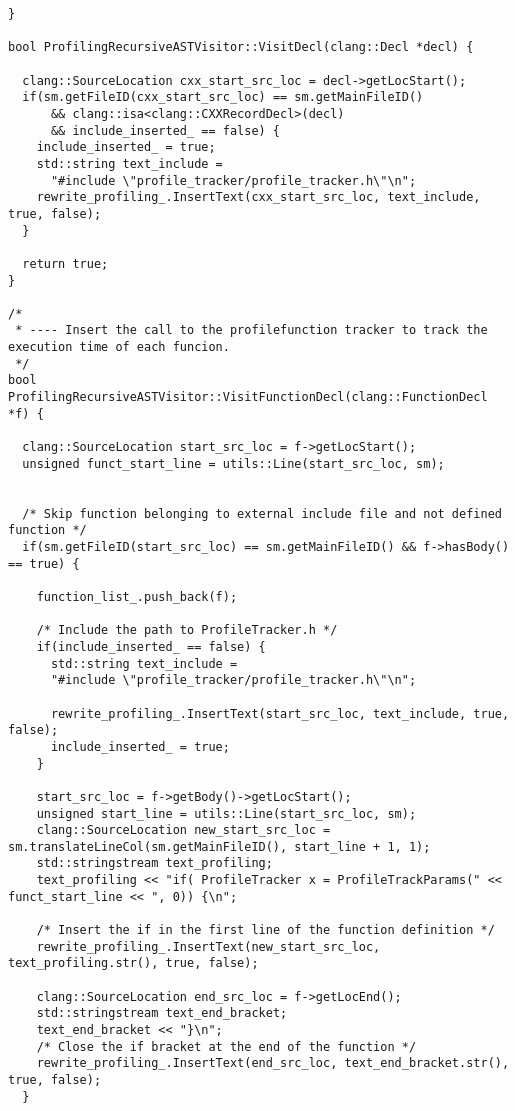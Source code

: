 \documentclass[a4paper,10pt,twoside]{book}
\begin{document}
\begin{lstlisting}[language=CCC, caption=driver/program.cpp]
}

bool ProfilingRecursiveASTVisitor::VisitDecl(clang::Decl *decl) {

  clang::SourceLocation cxx_start_src_loc = decl->getLocStart();
  if(sm.getFileID(cxx_start_src_loc) == sm.getMainFileID() 
      && clang::isa<clang::CXXRecordDecl>(decl)
      && include_inserted_ == false) {
    include_inserted_ = true;
    std::string text_include = 
      "#include \"profile_tracker/profile_tracker.h\"\n";
    rewrite_profiling_.InsertText(cxx_start_src_loc, text_include, true, false);
  }

  return true;
}

/*
 * ---- Insert the call to the profilefunction tracker to track the execution time of each funcion.
 */
bool ProfilingRecursiveASTVisitor::VisitFunctionDecl(clang::FunctionDecl *f) {     
    
  clang::SourceLocation start_src_loc = f->getLocStart();
  unsigned funct_start_line = utils::Line(start_src_loc, sm);


  /* Skip function belonging to external include file and not defined function */
  if(sm.getFileID(start_src_loc) == sm.getMainFileID() && f->hasBody() == true) {
  	
    function_list_.push_back(f);

    /* Include the path to ProfileTracker.h */
    if(include_inserted_ == false) {
      std::string text_include = 
      "#include \"profile_tracker/profile_tracker.h\"\n";
      
      rewrite_profiling_.InsertText(start_src_loc, text_include, true, false);
      include_inserted_ = true;
    } 

    start_src_loc = f->getBody()->getLocStart();
  	unsigned start_line = utils::Line(start_src_loc, sm);
    clang::SourceLocation new_start_src_loc = sm.translateLineCol(sm.getMainFileID(), start_line + 1, 1);
    std::stringstream text_profiling;
    text_profiling << "if( ProfileTracker x = ProfileTrackParams(" << funct_start_line << ", 0)) {\n";
    
    /* Insert the if in the first line of the function definition */
    rewrite_profiling_.InsertText(new_start_src_loc, text_profiling.str(), true, false);

    clang::SourceLocation end_src_loc = f->getLocEnd();
    std::stringstream text_end_bracket;
    text_end_bracket << "}\n";
    /* Close the if bracket at the end of the function */
    rewrite_profiling_.InsertText(end_src_loc, text_end_bracket.str(), true, false);
  }


\end{lstlisting}
\end{document}
